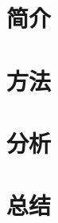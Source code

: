 \documentclass{si_template/cn_note}
\begin{document}
\frontmatter
\mainmatter
\chapter{简介}\label{chap:introduction}

\chapter{方法}\label{chap:method}

\chapter{分析}\label{chap:analysis}

% 
\chapter{总结}\label{chap:conclusion}


\backmatter
\end{document}
